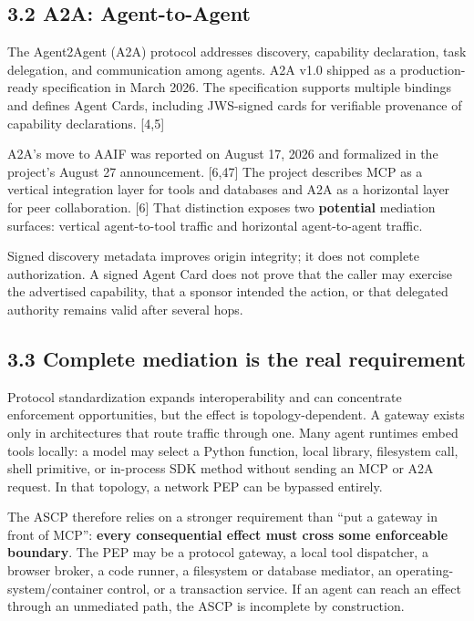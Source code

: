 \documentclass[
  10pt,
  letterpaper,
]{article}
\begin{document}
\subsection{3.2 A2A: Agent-to-Agent}\label{a2a-agent-to-agent}

The Agent2Agent (A2A) protocol addresses discovery, capability
declaration, task delegation, and communication among agents. A2A v1.0
shipped as a production-ready specification in March 2026. The
specification supports multiple bindings and defines Agent Cards,
including JWS-signed cards for verifiable provenance of capability
declarations. {[}4,5{]}

A2A's move to AAIF was reported on August 17, 2026 and formalized in the
project's August 27 announcement. {[}6,47{]} The project describes MCP
as a vertical integration layer for tools and databases and A2A as a
horizontal layer for peer collaboration. {[}6{]} That distinction
exposes two \textbf{potential} mediation surfaces: vertical
agent-to-tool traffic and horizontal agent-to-agent traffic.

Signed discovery metadata improves origin integrity; it does not
complete authorization. A signed Agent Card does not prove that the
caller may exercise the advertised capability, that a sponsor intended
the action, or that delegated authority remains valid after several
hops.

\subsection{3.3 Complete mediation is the real
requirement}\label{complete-mediation-is-the-real-requirement}

Protocol standardization expands interoperability and can concentrate
enforcement opportunities, but the effect is topology-dependent. A
gateway exists only in architectures that route traffic through one.
Many agent runtimes embed tools locally: a model may select a Python
function, local library, filesystem call, shell primitive, or in-process
SDK method without sending an MCP or A2A request. In that topology, a
network PEP can be bypassed entirely.

The ASCP therefore relies on a stronger requirement than ``put a gateway
in front of MCP'': \textbf{every consequential effect must cross some
enforceable boundary}. The PEP may be a protocol gateway, a local tool
dispatcher, a browser broker, a code runner, a filesystem or database
mediator, an operating-system/container control, or a transaction
service. If an agent can reach an effect through an unmediated path, the
ASCP is incomplete by construction.
\end{document}
